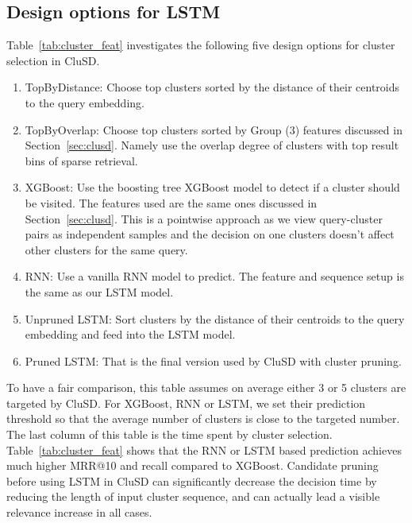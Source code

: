 \subsection{Design options for LSTM}
\label{sect:evalLSTM}

Table~\ref{tab:cluster_feat} investigates the following five design options 
for cluster selection in CluSD. 
\begin{enumerate}[leftmargin=*]
    \item TopByDistance: Choose top clusters sorted by the distance of their  centroids to  the  query embedding.
    \item TopByOverlap:  Choose top  clusters sorted  by Group (3) features discussed in Section~\ref{sec:clusd}.
Namely use the overlap degree of clusters with top result bins of sparse retrieval.  

    \item XGBoost: Use the boosting tree XGBoost model to detect if a cluster should be visited.
The features used are the same ones discussed in Section~\ref{sec:clusd}. This is a pointwise approach as we view query-cluster pairs as independent samples and the decision on one clusters doesn't affect other clusters for the same query.
    \item RNN: Use a vanilla RNN model to predict. The feature and sequence setup is the same as our LSTM model. 
    \item Unpruned LSTM: Sort clusters  by the distance of their  centroids to  the  query embedding and feed into the LSTM model.
    \item Pruned LSTM: That is the final version used by CluSD with  cluster pruning.
\end{enumerate}
To have a fair comparison, this table assumes on average either 3 or 5 clusters are targeted by CluSD.
For XGBoost, RNN or LSTM, we set their prediction threshold so that 
the average number of clusters is close to the targeted number.
The last column of this table is the time spent by cluster selection.
Table~\ref{tab:cluster_feat} shows that  the RNN or LSTM based prediction achieves much higher MRR@10 and recall compared to 
XGBoost. 
Candidate pruning before using LSTM in CluSD can significantly 
decrease  the decision time by reducing the length of input cluster sequence, and can  actually lead a visible relevance increase in all cases.

